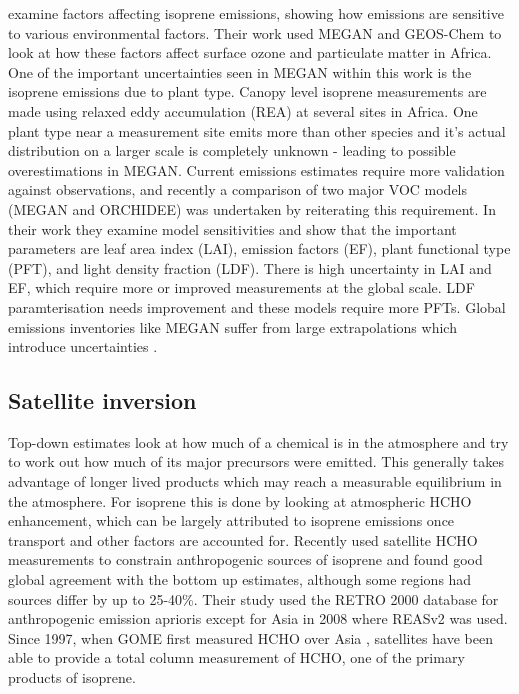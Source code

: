       \cite{Marais2014} examine factors affecting isoprene emissions, showing how emissions are sensitive to various environmental factors.
      Their work used MEGAN \citep{Guenther1995} and GEOS-Chem to look at how these factors affect surface ozone and particulate matter in Africa.
      One of the important uncertainties seen in MEGAN within this work is the isoprene emissions due to plant type.
      Canopy level isoprene measurements are made using relaxed eddy accumulation (REA) at several sites in Africa.
      One plant type near a measurement site emits more than other species and it's actual distribution on a larger scale is completely unknown - leading to possible overestimations in MEGAN.
      Current emissions estimates require more validation against observations, and recently a comparison of two major VOC models (MEGAN and ORCHIDEE) was undertaken by \cite{Messina2016} reiterating this requirement.
      In their work they examine model sensitivities and show that the important parameters are leaf area index (LAI), emission factors (EF), plant functional type (PFT), and light density fraction (LDF).
      There is high uncertainty in LAI and EF, which require more or improved measurements at the global scale.
      LDF paramterisation needs improvement and these models require more PFTs.
      Global emissions inventories like MEGAN suffer from large extrapolations which introduce uncertainties \citep{Miller2014}.
  
  
  
  \subsection{Satellite inversion}
  \label{LR:Models:SatelliteInversion}
  
    Top-down estimates look at how much of a chemical is in the atmosphere and try to work out how much of its major precursors were emitted.
    This generally takes advantage of longer lived products which may reach a measurable equilibrium in the atmosphere.
    For isoprene this is done by looking at atmospheric HCHO enhancement, which can be largely attributed to isoprene emissions once transport and other factors are accounted for.
    Recently \cite{Stavrakou2015} used satellite HCHO measurements to constrain anthropogenic sources of isoprene and found good global agreement with the bottom up estimates, although some regions had sources differ by up to 25-40\%. 
    Their study used the RETRO 2000 database for anthropogenic emission aprioris except for Asia in 2008 where REASv2 was used. 
    Since 1997, when GOME first measured HCHO over Asia \citep{Thomas1998}, satellites have been able to provide a total column measurement of HCHO, one of the primary products of isoprene.
    
